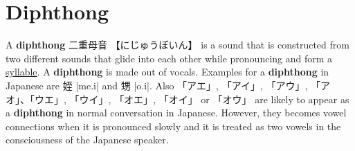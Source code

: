 \section{Diphthong} \label{sec:Diphthong}

A \textbf{diphthong} {二重母音} {【にじゅうぼいん】} is a sound that is
constructed from two different sounds that glide into each other while
pronouncing and form a \hyperref[sec:Syllable]{syllable}. A \textbf{diphthong}
is made out of vocals.  Examples for a \textbf{diphthong} in Japanese are {姪}
|me.i| and {甥} |o.i|.  Also  {「アエ」}, {「アイ」}, {「アウ」},
{「アオ」}、{「ウエ」}, {「ウイ」}, {「オエ」}, {「オイ」} or {「オウ」} are
likely to appear as a \textbf{diphthong} in normal conversation in Japanese.
However, they becomes vowel connections when it is pronounced slowly and it is
treated as two vowels in the consciousness of the Japanese speaker.
